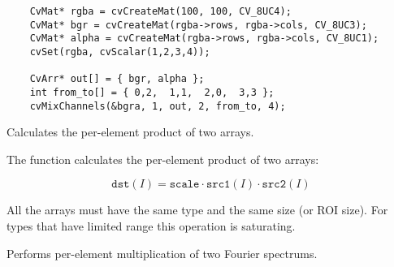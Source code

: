 \ifC
\begin{lstlisting}
    CvMat* rgba = cvCreateMat(100, 100, CV_8UC4);
    CvMat* bgr = cvCreateMat(rgba->rows, rgba->cols, CV_8UC3);
    CvMat* alpha = cvCreateMat(rgba->rows, rgba->cols, CV_8UC1);
    cvSet(rgba, cvScalar(1,2,3,4));

    CvArr* out[] = { bgr, alpha };
    int from_to[] = { 0,2,  1,1,  2,0,  3,3 };
    cvMixChannels(&bgra, 1, out, 2, from_to, 4);
\end{lstlisting}
\fi

Calculates the per-element product of two arrays.


\begin{description}
\end{description}


The function calculates the per-element product of two arrays:

\[
\texttt{dst}(I)=\texttt{scale} \cdot \texttt{src1}(I) \cdot \texttt{src2}(I)
\]

All the arrays must have the same type and the same size (or ROI size).
For types that have limited range this operation is saturating.

Performs per-element multiplication of two Fourier spectrums.


\begin{description}

\end{description}

